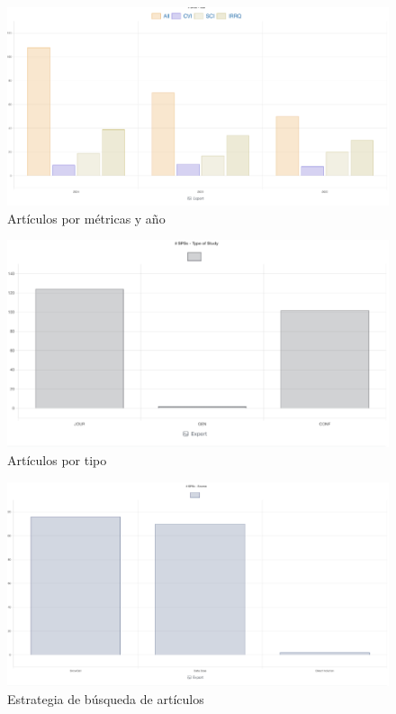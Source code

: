 \begin{figure}[H]
    \centering
    \includegraphics[width=\textwidth]{tablas-images/cp2/diagrama-articulos-ano-metrica.png}
    \caption{Artículos por métricas y año}\label{fig:diagrama-articulos-ano-metrica}
\end{figure}

\begin{figure}[H]
    \centering
    \includegraphics[width=\textwidth]{tablas-images/cp2/tipos-articulos.png}
    \caption{Artículos por tipo}\label{fig:tipos-articulos}
\end{figure}

\begin{figure}[H]
    \centering
    \includegraphics[width=\textwidth]{tablas-images/cp2/estrategia-busqueda-articulos.png}
    \caption{Estrategia de búsqueda de artículos}\label{fig:estrategia-busqueda-articulos}
\end{figure}

